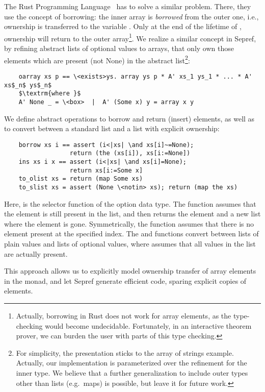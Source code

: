 \documentclass[sigplan,10pt,anonymous,review]{acmart}\settopmatter{printfolios=true,printccs=false,printacmref=false}
\theoremstyle{definition}
\begin{document}
  The Rust Programming Language~\cite{rustlang} has to solve a similar problem.
  There, they use the concept of borrowing: the inner array is \emph{borrowed} from the outer one,
  i.e., ownership is transferred to the variable . Only at the end of the lifetime of ,
  ownership will return to the outer array\footnote{Actually, borrowing in Rust does not work for array elements,
  as the type-checking would become undecidable. Fortunately, in an interactive theorem prover, we can burden the
  user with parts of this type checking.}. We realize a similar concept in Sepref, by refining abstract lists of
  optional values to arrays, that only own those elements which are present (not None) in the abstract list\footnote{For simplicity, the presentation sticks to the array of strings example. Actually, our implementation is parameterized over the refinement for the inner type.
  We believe that a further generalization to include outer types other than lists (e.g.\ maps) is possible, but leave it for future work.}:
  \begin{lstlisting}
    oarray xs p == \<exists>ys. array ys p * A' xs_1 ys_1 * ... * A' xs$_n$ ys$_n$
    $\textrm{where }$
    A' None _ = \<box>  |  A' (Some x) y = array x y
  \end{lstlisting}
  We define abstract operations to borrow and return (insert) elements, as well as to convert between a
  standard list and a list with explicit ownership:
  \begin{lstlisting}
    borrow xs i == assert (i<|xs| \and xs[i]~=None);
                  return (the (xs[i]), xs[i:=None])
    ins xs i x == assert (i<|xs| \and xs[i]=None);
                  return xs[i:=Some x]
    to_olist xs = return (map Some xs)
    to_slist xs = assert (None \<notin> xs); return (map the xs)
  \end{lstlisting}
  Here,  is the selector function of the option data type.
  The  function assumes that the element is still present in the list, and then returns the element
  and a new list where the element is gone. Symmetrically, the  function assumes that there is no element
  present at the specified index. The  and  functions convert between lists of plain values and lists
  of optional values, where  assumes that all values in the list are actually present.

  This approach allows us to explicitly model ownership transfer of array elements in the  monad, and let Sepref
  generate efficient code, sparing explicit copies of elements.
\end{document}
